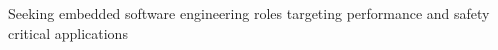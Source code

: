 

\begin{cvparagraph}


Seeking embedded software engineering roles targeting performance and safety critical applications

\end{cvparagraph}
